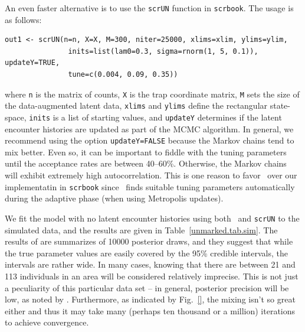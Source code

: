 An even faster alternative is to use the \verb+scrUN+ function in
\texttt{scrbook}.
The usage is as follows:
\begin{verbatim}
out1 <- scrUN(n=n, X=X, M=300, niter=25000, xlims=xlim, ylims=ylim,
               inits=list(lam0=0.3, sigma=rnorm(1, 5, 0.1)), updateY=TRUE,
               tune=c(0.004, 0.09, 0.35))
\end{verbatim}
where \verb+n+ is the matrix of counts, \verb+X+ is the trap
coordinate matrix, \verb+M+ sets the size of the data-augmented latent
data, \verb+xlims+ and \verb+ylims+ define the
rectangular state-space, \verb+inits+ is a list of starting values,
and \verb+updateY+ determines if the latent encounter histories are
updated as part of the MCMC algorithm. In general, %
we recommend using the option
\verb+updateY=FALSE+ because the Markov chains tend to mix
better. %
Even so, it can be important to fiddle with the tuning parameters until the
acceptance rates are between 40--60\%. Otherwise, the Markov chains
will exhibit extremely high autocorrelation. This is one reason to favor
\jags~over our implementatin in \texttt{scrbook} since \jags~finds
suitable tuning parameters automatically during the adaptive phase
(when using Metropolis updates).

We fit the model with no latent encounter histories using both
\jags~and \verb+scrUN+ to the simulated data, and the results
are given in Table~\ref{unmarked.tab.sim}. The results of are
summarizes of 10000 posterior draws, and they suggest that while the
true parameter values are easily covered by the 95\% credible
intervals, the intervals are rather wide. In many cases, knowing that
there are between 21 and 113 individuals in an area will be considered
relatively imprecise.
This is not just a
peculiarity of this particular data set -- in general, posterior
precision will be low, as noted by
\citet{chandler_royle:2012}. Furthermore,
as indicated by
Fig.~\ref{}, the mixing isn't so great either and thus it may take
many (perhaps ten thousand or a million) iterations to achieve convergence.

